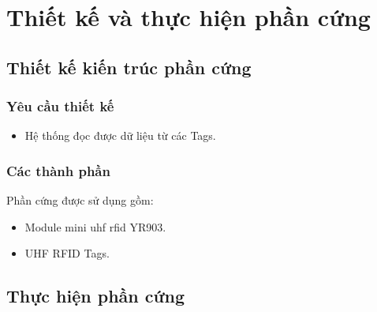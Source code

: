 \headerandfooterconfig

\chapter{Thiết kế và thực hiện phần cứng}
\section{Thiết kế kiến trúc phần cứng}
\subsection{Yêu cầu thiết kế}
\begin{itemize}
	\item Hệ thống đọc được dữ liệu từ các Tags.
\end{itemize}
\subsection{Các thành phần}
Phần cứng được sử dụng gồm:
\begin{itemize}
	\item Module mini uhf rfid YR903.
	\item UHF RFID Tags.
\end{itemize}
\label{ref{fig3_1}}
\label{ref{fig3_2}}
\label{ref{fig3_3}}
\label{ref{fig3_4}}
\label{ref{fig3_5}}

\section{Thực hiện phần cứng}